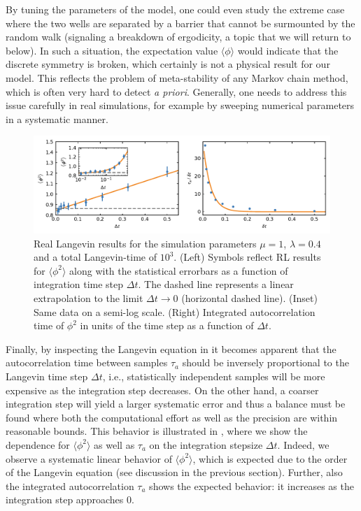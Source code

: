 \documentclass[../main.tex]{subfiles}
\begin{document}
By tuning the parameters of the model, one could even study the extreme case where the two wells are separated by a barrier that cannot be surmounted by the random walk
(signaling a breakdown of ergodicity, a topic that we will return to below). In such a situation, the expectation value $\langle \phi \rangle$ would indicate that the discrete symmetry is broken, which certainly is not a physical result for our model. This reflects the problem of meta-stability of any Markov chain method, which is often very hard to detect {\it a priori}. Generally, one needs to address this issue carefully in real simulations, for example by sweeping numerical parameters in a systematic manner.

\begin{figure}[t]
  \centering
  \includegraphics[width=\columnwidth]{./3mathunderpinnings/real_plot.pdf}
  \caption{\label{fig:sq_stepsize} Real Langevin results for the simulation parameters $\mu=1$, $\lambda=0.4$ and a total Langevin-time of $10^3$. (Left) Symbols reflect RL results for  $\langle\phi^2\rangle$ along with the statistical errorbars as a function of integration time step $\Delta t$. The dashed line represents a linear extrapolation to the limit $\Delta t\rightarrow 0$ (horizontal dashed line). (Inset) Same data on a semi-log scale. (Right) Integrated autocorrelation time of $\phi^2$ in units of the time step as a function of $\Delta t$.}
\end{figure}
%
Finally, by inspecting the Langevin equation in  it becomes apparent that the autocorrelation time between samples $\tau_a$ should be inversely proportional to the Langevin time step $\Delta t$, i.e., statistically independent samples will be more expensive as the integration step decreases. On the other hand, a coarser integration step will yield a larger systematic error and thus a balance must be found where both the computational effort as well as the precision are within reasonable bounds.
This behavior is illustrated in , where we show the dependence for $\langle\phi^2\rangle$ as well as $\tau_a$ on the integration stepsize $\Delta t$. Indeed, we observe a systematic linear behavior of $\langle\phi^2\rangle$, which is expected due to the order of the Langevin equation (see discussion in the previous section). Further, also the integrated autocorrelation $\tau_a$ shows the expected behavior: it increases as the integration step approaches $0$.
\end{document}
